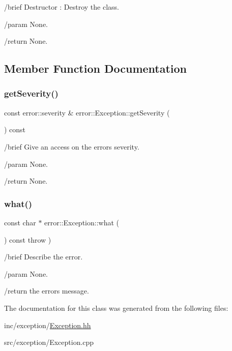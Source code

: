 /brief Destructor \+: Destroy the class. 

/param None.

/return None. 

\subsection{Member Function Documentation}
\mbox{\label{classerror_1_1Exception_a05f9c8eecf03bb0ca05d5fe2ec7fb36a}} 
\subsubsection{\texorpdfstring{get\+Severity()}{getSeverity()}}
{\footnotesize\ttfamily const error\+::severity \& error\+::\+Exception\+::get\+Severity (\begin{DoxyParamCaption}{ }\end{DoxyParamCaption}) const}



/brief Give an access on the error\textquotesingle{}s severity. 

/param None.

/return None. \mbox{\label{classerror_1_1Exception_a30163f5666745344a3aeba609727fb5a}} 
\subsubsection{\texorpdfstring{what()}{what()}}
{\footnotesize\ttfamily const char $\ast$ error\+::\+Exception\+::what (\begin{DoxyParamCaption}{ }\end{DoxyParamCaption}) const throw  ) }



/brief Describe the error. 

/param None.

/return the error\textquotesingle{}s message. 

The documentation for this class was generated from the following files\+:\begin{DoxyCompactItemize}
\item 
inc/exception/\hyperlink{Exception_8hh}{Exception.\+hh}\item 
src/exception/Exception.\+cpp\end{DoxyCompactItemize}
